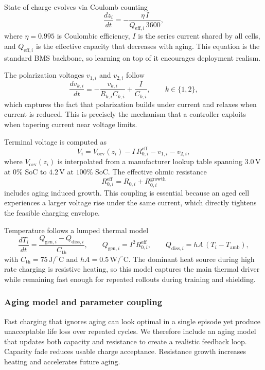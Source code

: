 \documentclass[%
 aip,
 amsmath,amssymb,
reprint, onecolumn %
]{revtex4-1}
\begin{document}
State of charge evolves via Coulomb counting
\begin{equation}
\frac{d z_i}{dt} = -\frac{\eta\,I}{Q_{\mathrm{eff},i}\,3600},
\end{equation}
where $\eta = 0.995$ is Coulombic efficiency, $I$ is the series current shared by all cells, and $Q_{\mathrm{eff},i}$ is the effective capacity that decreases with aging. This equation is the standard BMS backbone, so learning on top of it encourages deployment realism.

The polarization voltages $v_{1,i}$ and $v_{2,i}$ follow
\begin{equation}
\frac{d v_{k,i}}{dt} = -\frac{v_{k,i}}{R_{k,i} C_{k,i}} + \frac{I}{C_{k,i}},
\qquad
k \in \{1,2\},
\end{equation}
which captures the fact that polarization builds under current and relaxes when current is reduced. This is precisely the mechanism that a controller exploits when tapering current near voltage limits.

Terminal voltage is computed as
\begin{equation}
V_{i} = V_{\mathrm{ocv}}(z_i) - I\,R_{0,i}^{\mathrm{eff}} - v_{1,i} - v_{2,i},
\end{equation}
where $V_{\mathrm{ocv}}(z_i)$ is interpolated from a manufacturer lookup table spanning $3.0\,\mathrm{V}$ at $0\%$ SoC to $4.2\,\mathrm{V}$ at $100\%$ SoC. The effective ohmic resistance
\begin{equation}
R_{0,i}^{\mathrm{eff}} = R_{0,i} + R_{0,i}^{\mathrm{growth}}
\end{equation}
includes aging induced growth. This coupling is essential because an aged cell experiences a larger voltage rise under the same current, which directly tightens the feasible charging envelope.

Temperature follows a lumped thermal model
\begin{equation}
\frac{dT_i}{dt} = \frac{Q_{\mathrm{gen},i} - Q_{\mathrm{diss},i}}{C_{\mathrm{th}}},
\qquad
Q_{\mathrm{gen},i} = I^2 R_{0,i}^{\mathrm{eff}},
\qquad
Q_{\mathrm{diss},i} = hA\,(T_i - T_{\mathrm{amb}}),
\end{equation}
with $C_{\mathrm{th}} = 75\,\mathrm{J/^{\circ}C}$ and $hA = 0.5\,\mathrm{W/^{\circ}C}$. The dominant heat source during high rate charging is resistive heating, so this model captures the main thermal driver while remaining fast enough for repeated rollouts during training and shielding.

\subsubsection{Aging model and parameter coupling}
Fast charging that ignores aging can look optimal in a single episode yet produce unacceptable life loss over repeated cycles. We therefore include an aging model that updates both capacity and resistance to create a realistic feedback loop. Capacity fade reduces usable charge acceptance. Resistance growth increases heating and accelerates future aging.
\end{document}
